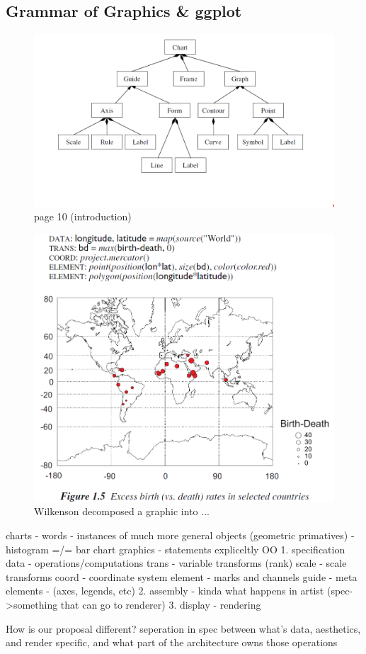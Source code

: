 \documentclass[letterpaper,onecolumn,titlepage]{Ythesis}
\begin{document}
\subsection{Grammar of Graphics \& ggplot}
\begin{figure}
    \includegraphics{figures/intro/grammar_chart_composition.png}
    \caption{page 10 (introduction)}
\end{figure}
\begin{figure}
    \includegraphics{figures/intro/grammar_example.png}
    \caption{Wilkenson decomposed a graphic into ...} 
\end{figure}
\cite{wilkinsonGrammarGraphicsStatistics2005}
charts - words 
    - instances of much more general objects (geometric primatives)
    - histogram =/= bar chart
graphics - statements 
expliceltly OO
    1. specification
        data - operations/computations
        trans - variable transforms (rank)
        scale - scale transforms
        coord - coordinate system
        element - marks and channels
        guide - meta elements - (axes, legends, etc)
    2. assembly - kinda what happens in artist (spec->something that can go to renderer) 
    3. display - rendering

How is our proposal different? seperation in spec between what's data, aesthetics, and render specific, and what part of the architecture owns those operations





\cite{wickhamGgplot2ElegantGraphics2016}


\printbibliography
\end{document}
